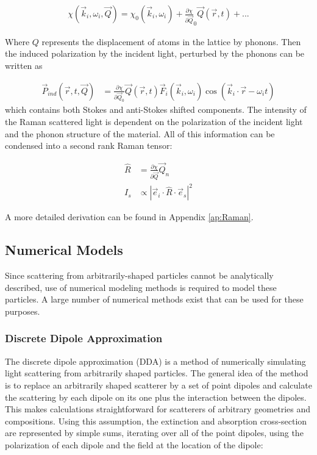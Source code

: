             \begin{align}
                \chi(\vec{k}_i, \omega_i, \vec{Q}) = \chi_0(\vec{k}_i, \omega_i) + \frac{\partial\chi}{\partial\vec{Q}}_0\vec{Q}(\vec{r},t) + ...
            \end{align}

            Where $Q$ represents the displacement of atoms in the lattice by phonons.
            Then the induced polarization by the incident light, perturbed by the phonons can be written as

            \begin{align}
                \vec{P}_{ind}(\vec{r}, t, \vec{Q}) &= \frac{\partial\chi}{\partial\vec{Q}_0}\vec{Q}(\vec{r},t)
                                                        \vec{F}_i(\vec{k}_i, \omega_i)\cos(\vec{k}_i\cdot\vec{r}-\omega_i t)
            \end{align}
            which contains both Stokes and anti-Stokes shifted components. The intensity of the Raman scattered light
            is dependent on the polarization of the incident light and the phonon structure of the material. All of this
            information can be condensed into a second rank Raman tensor:

            \begin{align}
                \hat{R} &= \frac{\partial\chi}{\partial\vec{Q}}\vec{Q}_n \\
                I_s &\propto | \vec{e}_i \cdot \hat{R} \cdot\vec{e}_s|^2
            \end{align}

            A more detailed derivation can be found in Appendix \ref{ap:Raman}.

    \subsection{Numerical Models}
            Since scattering from arbitrarily-shaped particles cannot be analytically described, use of numerical modeling methods
        is required to model these particles. A large number of numerical methods exist that can be used for these purposes.

        \subsubsection{Discrete Dipole Approximation}
                The discrete dipole approximation (DDA) is a method of numerically simulating light scattering from arbitrarily shaped particles.
            The general idea of the method is to replace an arbitrarily shaped scatterer by a set of point dipoles and calculate the
            scattering by each dipole on its one plus the interaction between the dipoles. This makes calculations straightforward
            for scatterers of arbitrary geometries and compositions. Using this assumption, the extinction and absorption cross-section
            are represented by simple sums, iterating over all of the point dipoles, using the polarization of each dipole and the field at
            the location of the dipole\cite{yurkin2007discrete}:

